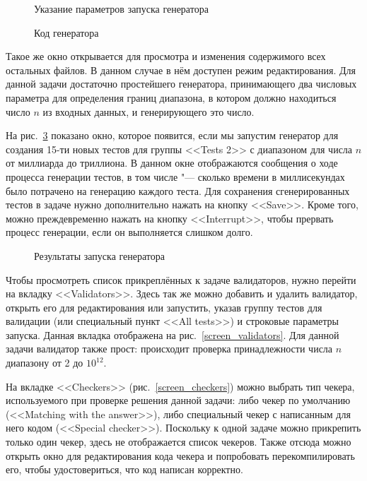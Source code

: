 \begin{figure}[!hb]
\caption{Указание параметров запуска генератора}
\label{screen_generators}
\end{figure}

\begin{figure}[!hb]
\caption{Код генератора}
\label{screen_generator_code}
\end{figure}

Такое же окно открывается для просмотра и изменения содержимого всех остальных файлов. В данном случае в нём доступен режим редактирования. Для данной задачи достаточно простейшего генератора, принимающего два числовых параметра для определения границ диапазона, в котором должно находиться число $n$ из входных данных, и генерирующего это число.

На рис.~\ref{screen_generator_result} показано окно, которое появится, если мы запустим генератор для создания 15-ти новых тестов для группы <<Tests 2>> с диапазоном для числа $n$ от миллиарда до триллиона. В данном окне отображаются сообщения о ходе процесса генерации тестов, в том числе "--- сколько времени в миллисекундах было потрачено на генерацию каждого теста. Для сохранения сгенерированных тестов в задаче нужно дополнительно нажать на кнопку <<Save>>. Кроме того, можно преждевременно нажать на кнопку <<Interrupt>>, чтобы прервать процесс генерации, если он выполняется слишком долго.

\begin{figure}[!h]
\caption{Результаты запуска генератора}
\label{screen_generator_result}
\end{figure}

Чтобы просмотреть список прикреплённых к задаче валидаторов, нужно перейти на вкладку <<Validators>>. Здесь так же можно добавить и удалить валидатор, открыть его для редактирования или запустить, указав группу тестов для валидации (или специальный пункт <<All tests>>) и строковые параметры запуска. Данная вкладка отображена на рис.~\ref{screen_validators}. Для данной задачи валидатор также прост: происходит проверка принадлежности числа $n$ диапазону от 2 до $10^{12}$.

На вкладке <<Checkers>> (рис.~\ref{screen_checkers}) можно выбрать тип чекера, используемого при проверке решения данной задачи: либо чекер по умолчанию (<<Matching with the answer>>), либо специальный чекер с написанным для него кодом (<<Special checker>>). Поскольку к одной задаче можно прикрепить только один чекер, здесь не отображается список чекеров. Также отсюда можно открыть окно для редактирования кода чекера и попробовать перекомпилировать его, чтобы удостовериться, что код написан корректно.

